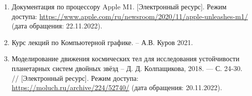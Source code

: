 \begin{enumerate}
	\item Документация по процессору Apple M1. [Электронный ресурс]. Режим доступа: \url{https://www.apple.com/ru/newsroom/2020/11/apple-unleashes-m1/} (дата обращения: 22.11.2022). \label{bib:12}
	\item Курс лекций по Компьютерной графике. -- А.В. Куров 2021. \label{bib:13}
	\item Моделирование движения космических тел для исследования устойчивости планетарных систем двойных звёзд -- Д. Д. Колпащикова, 2018.  — С. 24-30. // [Электронный ресурс]. Режим доступа: \url{https://moluch.ru/archive/224/52740/} (дата обращения: 20.11.2022). \label{bib:14}
\end{enumerate}